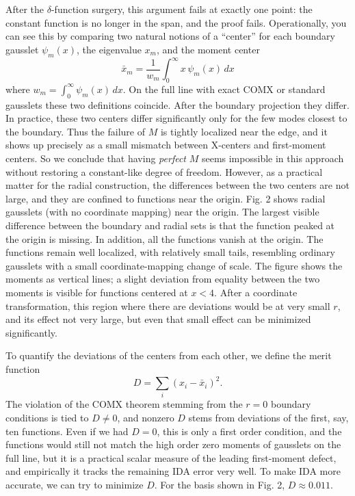 \documentclass[aps,pra,reprint,longbibliography,nofootinbib]{revtex4-2}
\begin{document}
After the $\delta$-function surgery, this argument fails at exactly one point: the constant function is no longer in the span, and the proof fails.  Operationally, you can see this by comparing two natural notions of a ``center'' for each boundary gausslet $\psi_m(x)$, the eigenvalue $x_m$, and the moment center
\begin{equation}
\bar x_m = \frac{1}{w_m} \int_0^\infty x\,\psi_m(x)\,dx 
\end{equation}
where $w_m = \int_0^\infty \psi_m(x)\,dx$.
On the full line with exact COMX or standard gausslets these two definitions coincide. After the boundary projection they differ. In practice, these two centers differ significantly only  for the few modes closest to the boundary. Thus the failure of $M$ is tightly localized near the edge, and it shows up precisely as a small mismatch between X-centers and first-moment centers. So we conclude that having \emph{perfect} $M$ seems impossible in this approach without restoring a constant-like degree of freedom.  However, as a practical matter for the radial construction, the differences between the two centers are not large, and they are confined to functions near the origin.  Fig. 2 shows radial gausslets (with no coordinate mapping) near the origin. The largest visible difference between the boundary and radial sets is that the function peaked at the origin is missing. In addition, all the functions vanish at the origin. The functions remain well localized, with relatively small tails, resembling ordinary gausslets with a small coordinate-mapping change of scale.  The figure shows the moments as vertical lines; a slight deviation from equality between the two moments is visible for functions centered at $x < 4$. After a coordinate transformation, this region where there are deviations would be at very small $r$, and its effect not very large, but even that small effect can be minimized significantly.

To quantify the deviations of the centers from each other, we define the merit function
\begin{equation}
D = \sum_i (x_i - \bar x_i)^2.
\label{Eq:Ddef}
\end{equation}
The violation of the COMX theorem stemming from the $r=0$ boundary conditions is tied to $D \ne 0$, and nonzero $D$ stems from deviations of the first, say, ten functions. Even if we had $D=0$, this is only a first order condition, and the functions would still not match the high order zero moments of gausslets on the full line,  but it is a practical scalar measure of the leading first-moment defect, and empirically it tracks the remaining IDA error very well. To make IDA more accurate, we can try to minimize $D$. For the basis shown in Fig. 2, $D \approx 0.011$.
\end{document}
